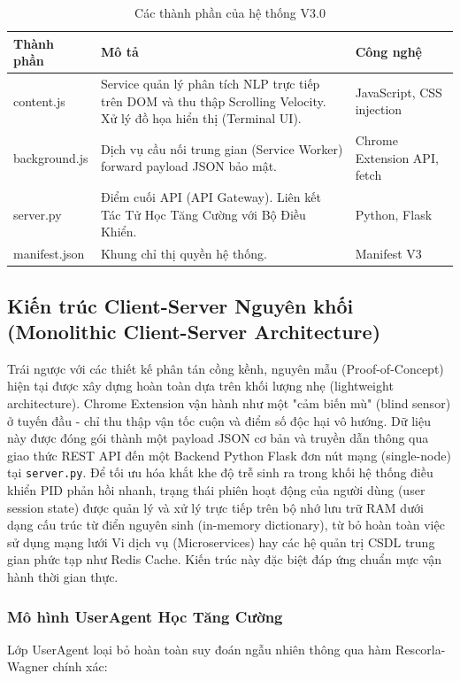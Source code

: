 \begin{table}[H]
\centering
\caption{Các thành phần của hệ thống V3.0}
\begin{tabular}{|l|p{5cm}|p{6cm}|}
\hline
Thành phần & Mô tả & Công nghệ \\
\hline
content.js & Service quản lý phân tích NLP trực tiếp trên DOM và thu thập Scrolling Velocity. Xử lý đồ họa hiển thị (Terminal UI). & JavaScript, CSS injection \\
\hline
background.js & Dịch vụ cầu nối trung gian (Service Worker) forward payload JSON bảo mật. & Chrome Extension API, fetch \\
\hline
server.py & Điểm cuối API (API Gateway). Liên kết Tác Tử Học Tăng Cường với Bộ Điều Khiển. & Python, Flask \\
\hline
manifest.json & Khung chỉ thị quyền hệ thống. & Manifest V3 \\
\hline
\end{tabular}
\end{table}

\subsection{Kiến trúc Client-Server Nguyên khối (Monolithic Client-Server Architecture)}

Trái ngược với các thiết kế phân tán cồng kềnh, nguyên mẫu (Proof-of-Concept) hiện tại được xây dựng hoàn toàn dựa trên khối lượng nhẹ (lightweight architecture). Chrome Extension vận hành như một "cảm biến mù" (blind sensor) ở tuyến đầu - chỉ thu thập vận tốc cuộn và điểm số độc hại vô hướng. Dữ liệu này được đóng gói thành một payload JSON cơ bản và truyền dẫn thông qua giao thức REST API đến một Backend Python Flask đơn nút mạng (single-node) tại \texttt{server.py}. Để tối ưu hóa khắt khe độ trễ sinh ra trong khối hệ thống điều khiển PID phản hồi nhanh, trạng thái phiên hoạt động của người dùng (user session state) được quản lý và xử lý trực tiếp trên bộ nhớ lưu trữ RAM dưới dạng cấu trúc từ điển nguyên sinh (in-memory dictionary), từ bỏ hoàn toàn việc sử dụng mạng lưới Vi dịch vụ (Microservices) hay các hệ quản trị CSDL trung gian phức tạp như Redis Cache. Kiến trúc này đặc biệt đáp ứng chuẩn mực vận hành thời gian thực.

\subsubsection{Mô hình UserAgent Học Tăng Cường}

Lớp UserAgent loại bỏ hoàn toàn suy đoán ngẫu nhiên thông qua hàm Rescorla-Wagner chính xác:

